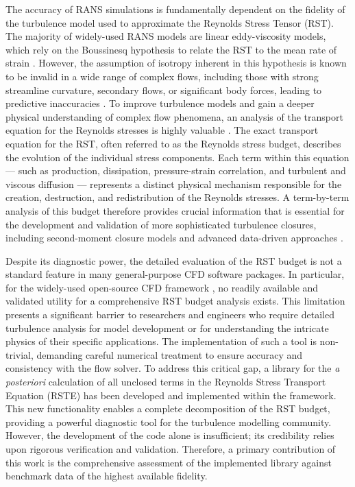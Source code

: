 The accuracy of RANS simulations is fundamentally dependent on the fidelity of the turbulence model used to approximate the Reynolds Stress Tensor (RST). The majority of widely-used RANS models are linear eddy-viscosity models, which rely on the Boussinesq hypothesis to relate the RST to the mean rate of strain \cite{boussinesq1877essai}. However, the assumption of isotropy inherent in this hypothesis is known to be invalid in a wide range of complex flows, including those with strong streamline curvature, secondary flows, or significant body forces, leading to predictive inaccuracies \cite{speziale1990analytical, gatski2004constitutive}. To improve turbulence models and gain a deeper physical understanding of complex flow phenomena, an analysis of the transport equation for the Reynolds stresses is highly valuable \cite{launder1975progress}. The exact transport equation for the RST, often referred to as the Reynolds stress budget, describes the evolution of the individual stress components. Each term within this equation --- such as production, dissipation, pressure-strain correlation, and turbulent and viscous diffusion --- represents a distinct physical mechanism responsible for the creation, destruction, and redistribution of the Reynolds stresses. A term-by-term analysis of this budget therefore provides crucial information that is essential for the development and validation of more sophisticated turbulence closures, including second-moment closure models and advanced data-driven approaches \cite{DURAISAMY2025311, launder1989second, rincon2023progressive, amarloo2023progressive,
hansen2023pod,hansen2024extension,rincon2025generalisable}.

Despite its diagnostic power, the detailed evaluation of the RST budget is not a standard feature in many general-purpose CFD software packages. In particular, for the widely-used open-source CFD framework \OF \cite{weller1998tensorial}, no readily available and validated utility for a comprehensive RST budget analysis exists. This limitation presents a significant barrier to researchers and engineers who require detailed turbulence analysis for model development or for understanding the intricate physics of their specific applications. The implementation of such a tool is non-trivial, demanding careful numerical treatment to ensure accuracy and consistency with the flow solver. To address this critical gap, a library for the \textit{a posteriori} calculation of all unclosed terms in the Reynolds Stress Transport Equation (RSTE) has been developed and implemented within the \OF framework. This new functionality enables a complete decomposition of the RST budget, providing a powerful diagnostic tool for the turbulence modelling community. However, the development of the code alone is insufficient; its credibility relies upon rigorous verification and validation. Therefore, a primary contribution of this work is the comprehensive assessment of the implemented library against benchmark data of the highest available fidelity.

